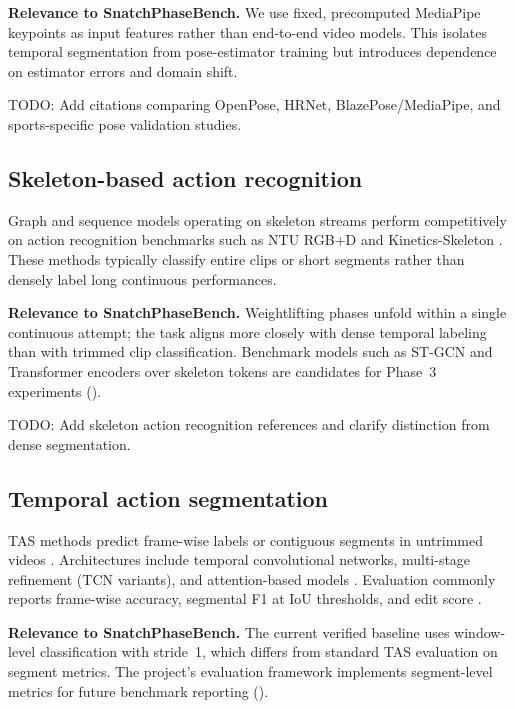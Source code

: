 \textbf{Relevance to SnatchPhaseBench.}
We use fixed, precomputed MediaPipe keypoints as input features rather than end-to-end video models.
This isolates temporal segmentation from pose-estimator training but introduces dependence on estimator errors and domain shift.

\textsc{TODO:} Add citations comparing OpenPose, HRNet, BlazePose/MediaPipe, and sports-specific pose validation studies.

\subsection{Skeleton-based action recognition}
\label{sec:related:action}

Graph and sequence models operating on skeleton streams perform competitively on action recognition benchmarks such as NTU RGB+D and Kinetics-Skeleton .
These methods typically classify entire clips or short segments rather than densely label long continuous performances.

\textbf{Relevance to SnatchPhaseBench.}
Weightlifting phases unfold within a single continuous attempt; the task aligns more closely with dense temporal labeling than with trimmed clip classification.
Benchmark models such as \acs{ST-GCN} and Transformer encoders over skeleton tokens are candidates for Phase~3 experiments ().

\textsc{TODO:} Add skeleton action recognition references and clarify distinction from dense segmentation.

\subsection{Temporal action segmentation}
\label{sec:related:tas}

\acf{TAS} methods predict frame-wise labels or contiguous segments in untrimmed videos .
Architectures include temporal convolutional networks, multi-stage refinement (\acs{TCN} variants), and attention-based models .
Evaluation commonly reports frame-wise accuracy, segmental F1 at IoU thresholds, and edit score .

\textbf{Relevance to SnatchPhaseBench.}
The current verified baseline uses window-level classification with stride~1, which differs from standard \acs{TAS} evaluation on segment metrics.
The project's evaluation framework implements segment-level metrics for future benchmark reporting ().

